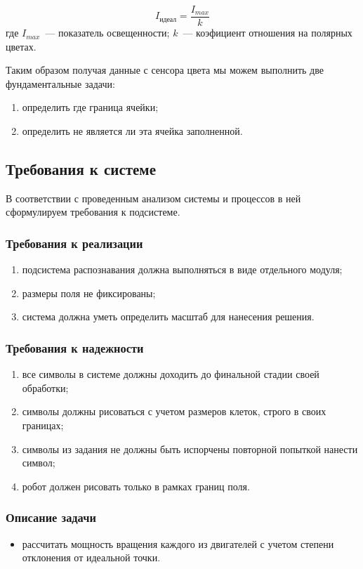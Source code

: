 \begin{equation}
\label{f:perfectPoint}
I_\text{идеал}= \frac{I_{max}}{ k }
\end{equation}
где $I_{max}$~--- показатель освещенности; $k$~--- коэфициент отношения на полярных цветах.

Таким образом получая данные с сенсора цвета мы можем выполнить две фундаментальные задачи:
\begin{enumerate}
 \item определить где граница ячейки;
 \item определить не является ли эта ячейка заполненной.
\end{enumerate}


\subsection{Требования к системе}
В соответствии с проведенным анализом системы и процессов в ней сформулируем требования к подсистеме.

\subsubsection*{Требования к реализации}
\begin{enumerate}
 \item подсистема распознавания должна выполняться в виде отдельного модуля;
 \item размеры поля не фиксированы;
 \item система должна уметь определить масштаб для нанесения решения.
\end{enumerate}

\subsubsection*{Требования к надежности}
\begin{enumerate}
 \item все символы в системе должны доходить до финальной стадии своей обработки;
 \item символы должны рисоваться с учетом размеров клеток, строго в своих границах;
 \item символы из задания не должны быть испорчены повторной попыткой нанести символ;
 \item робот должен рисовать только в рамках границ поля.
\end{enumerate}



\subsubsection*{Описание задачи }
\begin{itemize}
\item рассчитать мощность вращения каждого из двигателей с учетом степени отклонения от идеальной точки.  
\end{itemize}


